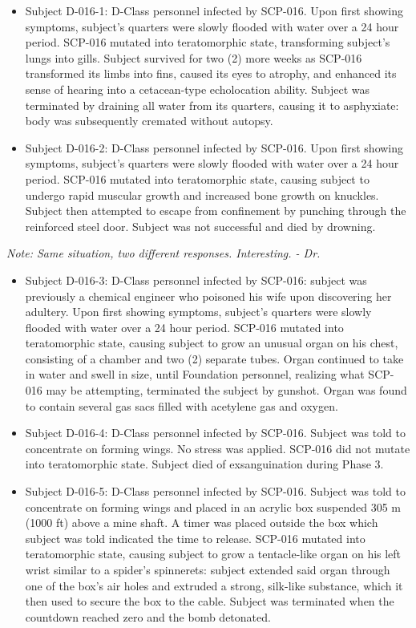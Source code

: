 \begin{itemize}
\item Subject D-016-1: D-Class personnel infected by SCP-016. Upon first showing symptoms, subject's quarters were slowly flooded with water over a 24 hour period. SCP-016 mutated into teratomorphic state, transforming subject's lungs into gills. Subject survived for two (2) more weeks as SCP-016 transformed its limbs into fins, caused its eyes to atrophy, and enhanced its sense of hearing into a cetacean-type echolocation ability. Subject was terminated by draining all water from its quarters, causing it to asphyxiate: body was subsequently cremated without autopsy.
\item Subject D-016-2: D-Class personnel infected by SCP-016. Upon first showing symptoms, subject's quarters were slowly flooded with water over a 24 hour period. SCP-016 mutated into teratomorphic state, causing subject to undergo rapid muscular growth and increased bone growth on knuckles. Subject then attempted to escape from confinement by punching through the reinforced steel door. Subject was not successful and died by drowning.
\end{itemize}
\textsl{Note: Same situation, two different responses. Interesting. - Dr. }

\begin{itemize}
\item Subject D-016-3: D-Class personnel infected by SCP-016: subject was previously a chemical engineer who poisoned his wife upon discovering her adultery. Upon first showing symptoms, subject's quarters were slowly flooded with water over a 24 hour period. SCP-016 mutated into teratomorphic state, causing subject to grow an unusual organ on his chest, consisting of a chamber and two (2) separate tubes. Organ continued to take in water and swell in size, until Foundation personnel, realizing what SCP-016 may be attempting, terminated the subject by gunshot. Organ was found to contain several gas sacs filled with acetylene gas and oxygen.
\item Subject D-016-4: D-Class personnel infected by SCP-016. Subject was told to concentrate on forming wings. No stress was applied. SCP-016 did not mutate into teratomorphic state. Subject died of exsanguination during Phase 3.
\item Subject D-016-5: D-Class personnel infected by SCP-016. Subject was told to concentrate on forming wings and placed in an acrylic box suspended 305 m (1000 ft) above a mine shaft. A timer was placed outside the box which subject was told indicated the time to release. SCP-016 mutated into teratomorphic state, causing subject to grow a tentacle-like organ on his left wrist similar to a spider's spinnerets: subject extended said organ through one of the box's air holes and extruded a strong, silk-like substance, which it then used to secure the box to the cable. Subject was terminated when the countdown reached zero and the bomb detonated.
\end{itemize}